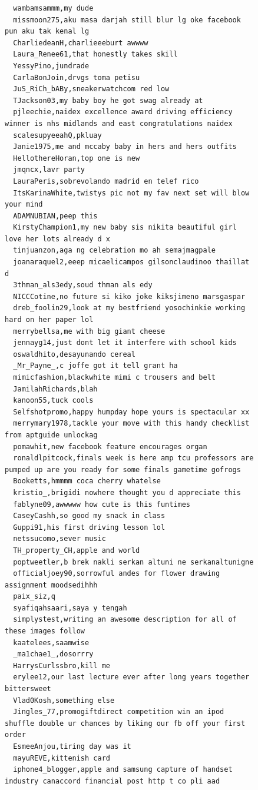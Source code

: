 \begin{figure}[htpb]
\begin{verbatim}
  wambamsammm,my dude
  missmoon275,aku masa darjah still blur lg oke facebook pun aku tak kenal lg
  CharliedeanH,charlieeeburt awwww
  Laura_Renee61,that honestly takes skill
  YessyPino,jundrade
  CarlaBonJoin,drvgs toma petisu
  JuS_RiCh_bABy,sneakerwatchcom red low
  TJackson03,my baby boy he got swag already at
  pjleechie,naidex excellence award driving efficiency winner is nhs midlands and east congratulations naidex
  scalesupyeeahQ,pkluay
  Janie1975,me and mccaby baby in hers and hers outfits
  HellothereHoran,top one is new
  jmqncx,lavr party
  LauraPeris,sobrevolando madrid en telef rico
  ItsKarinaWhite,twistys pic not my fav next set will blow your mind
  ADAMNUBIAN,peep this
  KirstyChampion1,my new baby sis nikita beautiful girl love her lots already d x
  tinjuanzon,aga ng celebration mo ah semajmagpale
  joanaraquel2,eeep micaelicampos gilsonclaudinoo thaillat d
  3thman_als3edy,soud thman als edy
  NICCCotine,no future si kiko joke kiksjimeno marsgaspar
  dreb_foolin29,look at my bestfriend yosochinkie working hard on her paper lol
  merrybellsa,me with big giant cheese
  jennayg14,just dont let it interfere with school kids
  oswaldhito,desayunando cereal
  _Mr_Payne_,c joffe got it tell grant ha
  mimicfashion,blackwhite mimi c trousers and belt
  JamilahRichards,blah
  kanoon55,tuck cools
  Selfshotpromo,happy humpday hope yours is spectacular xx
  merrymary1978,tackle your move with this handy checklist from aptguide unlockag
  pomawhit,new facebook feature encourages organ
  ronaldlpitcock,finals week is here amp tcu professors are pumped up are you ready for some finals gametime gofrogs
  Booketts,hmmmm coca cherry whatelse
  kristio_,brigidi nowhere thought you d appreciate this
  fablyne09,awwwww how cute is this funtimes
  CaseyCashh,so good my snack in class
  Guppi91,his first driving lesson lol
  netssucomo,sever music
  TH_property_CH,apple and world
  poptweetler,b brek nakli serkan altuni ne serkanaltunigne
  officialjoey90,sorrowful andes for flower drawing assignment moodsedihhh
  paix_siz,q
  syafiqahsaari,saya y tengah
  simplystest,writing an awesome description for all of these images follow
  kaatelees,saamwise
  _ma1chae1_,dosorrry
  HarrysCurlssbro,kill me
  erylee12,our last lecture ever after long years together bittersweet
  Vlad0Kosh,something else
  Jingles_77,promogiftdirect competition win an ipod shuffle double ur chances by liking our fb off your first order
  EsmeeAnjou,tiring day was it
  mayuREVE,kittenish card
  iphone4_blogger,apple and samsung capture of handset industry canaccord financial post http t co pli aad

\end{verbatim}
\end{figure}
